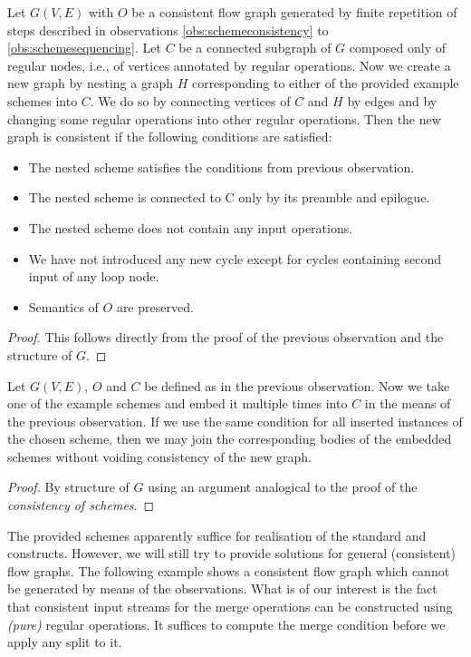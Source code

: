   Let $G(V,E)$ with $O$ be a consistent flow graph generated by finite repetition of steps described in observations \ref{obs:schemeconsistency} to \ref{obs:schemesequencing}. Let $C$ be a connected subgraph of $G$ composed only of regular nodes, i.e., of vertices annotated by regular operations. Now we create a new graph by nesting a graph $H$ corresponding to either of the provided example schemes into $C$. We do so by connecting vertices of $C$ and $H$ by edges and by changing some regular operations into other regular operations. Then the new graph is consistent if the following conditions are satisfied:
  \begin{itemize}
    \item The nested scheme satisfies the conditions from previous observation.
    \item The nested scheme is connected to C only by its preamble and epilogue.
    \item The nested scheme does not contain any input operations. 
    \item We have not introduced any new cycle except for cycles containing second input of any loop node.
    \item Semantics of $O$ are preserved.
  \end{itemize}
  \begin{proof} 
    This follows directly from the proof of the previous observation and the structure of $G$.
  \end{proof}
\myendobs

  Let $G(V,E)$, $O$ and $C$ be defined as in the previous observation. Now we take one of the example schemes and embed it multiple times into $C$ in the means of the previous observation. If we use the same condition for all inserted instances of the chosen scheme, then we may join the corresponding bodies of the embedded schemes without voiding consistency of the new graph.
  \begin{proof} 
    By structure of $G$ using an argument analogical to the proof of the \emph{consistency of schemes}.
  \end{proof}
\myendobs


The provided schemes apparently suffice for realisation of the standard  and  constructs. However, we will still try to provide solutions for general (consistent) flow graphs. The following example shows a consistent flow graph which cannot be generated by means of the observations. What is of our interest is the fact that consistent input streams for the merge operations can be constructed using \emph{(pure)} regular operations. It suffices to compute the merge condition before we apply any split to it.

